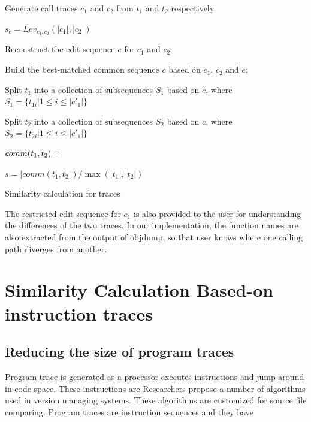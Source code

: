 \documentclass[10pt,journal,cspaper,compsoc]{IEEEtran}
\begin{document}
\begin{algorithm}[H]



Generate call traces $c_1$ and $c_2$ from $t_1$ and $t_2$
respectively\;

$s_c=Lev_{c_1,c_2}(|c_1|,|c_2|)$\;

Reconstruct the edit sequence $e$ for $c_1$ and $c_2$\;

Build the best-matched common sequence $c$ based on $c_1$, $c_2$ and
$e$;

Split $t_1$ into a collection of subsequences $S_1$ based on $c$,
where $S_1=\{t_{1i}|1\leq i \leq |c'_1|\}$\;

Split $t_2$ into a collection of subsequences $S_2$ based on $c$,
where $S_2=\{t_{2i}|1\leq i \leq |c'_1|\}$ \;

$comm(t_1, t_2)=\empty$\;


$s={|comm(t_1, t_2|)}/{\max{(|t_1|,|t_{2}|)}}$\;

\caption{Similarity calculation for traces} \label{alg:similarity}
\end{algorithm}

The restricted edit sequence for $c_1$ is also provided to the user
for understanding the differences of the two traces. In our
implementation, the function names are also extracted from the
output of objdump, so that user knows where one calling path
diverges from another.

\section{Similarity Calculation Based-on instruction traces}
\subsection{Reducing the size of program traces}
Program trace is generated as a processor executes instructions and
jump around in code space. These instructions are Researchers
propose a number of algorithms used in version managing systems.
These algorithms are customized for source file comparing. Program
traces are instruction sequences and they have
\end{document}
